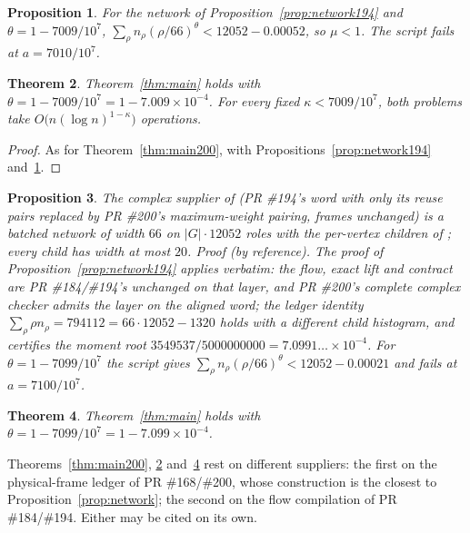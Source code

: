 \documentclass[11pt]{article}
\newtheorem{theorem}{Theorem}[section]
\newtheorem{proposition}[theorem]{Proposition}
\theoremstyle{definition}
\begin{document}
\begin{proposition}\label{prop:moment194}
For the network of Proposition~\ref{prop:network194} and
$\theta=1-7009/10^{7}$,
$\sum_\rho n_\rho(\rho/66)^{\theta}<12052-0.00052$, so $\mu<1$. The script fails
at $a=7010/10^{7}$.
\end{proposition}

\begin{theorem}\label{thm:main194}
Theorem~\ref{thm:main} holds with $\theta=1-7009/10^{7}=1-7.009\times10^{-4}$.
For every fixed $\kappa<7009/10^{7}$, both problems take
$O\bigl(n(\log n)^{1-\kappa}\bigr)$ operations.
\end{theorem}

\begin{proof}
As for Theorem~\ref{thm:main200}, with
Propositions~\ref{prop:network194} and~\ref{prop:moment194}.
\end{proof}

\begin{proposition}\label{prop:network233}
The complex supplier of \cite{pr233} (PR \#194's word with only its reuse
pairs replaced by PR \#200's maximum-weight pairing, frames unchanged) is a
batched network of width $66$ on $|G|\cdot12052$ roles with the per-vertex
children of ; every child has
width at most $20$. \emph{Proof (by reference).} The proof of
Proposition~\ref{prop:network194} applies verbatim: the flow, exact lift and
contract are PR \#184/\#194's unchanged on that layer, and PR \#200's complete
complex checker admits the layer on the aligned word; the ledger identity
$\sum_\rho\rho n_\rho=794112=66\cdot12052-1320$ holds with a different child
histogram, and \cite{pr233} certifies the moment root
$3549537/5000000000=7.0991\ldots\times10^{-4}$. For $\theta=1-7099/10^{7}$ the
script gives $\sum_\rho n_\rho(\rho/66)^\theta<12052-0.00021$ and fails at
$a=7100/10^{7}$.
\end{proposition}

\begin{theorem}\label{thm:main233}
Theorem~\ref{thm:main} holds with $\theta=1-7099/10^{7}=1-7.099\times10^{-4}$.
\end{theorem}

Theorems~\ref{thm:main200}, \ref{thm:main194} and~\ref{thm:main233} rest on different
suppliers: the first on the physical-frame ledger of PR \#168/\#200, whose
construction is the closest to Proposition~\ref{prop:network}; the second on
the flow compilation of PR \#184/\#194. Either may be cited on its own.
\end{document}
